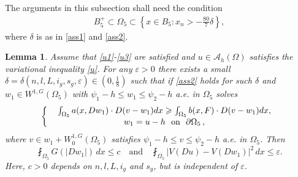 \documentclass[10pt,a4paper]{article}
\newtheorem{lemma}[theorem]{Lemma}
\theoremstyle{definition}
\numberwithin{equation}{section}
\begin{document}
 The arguments in this subsection shall need the condition
\begin{align}\label{ass3}
 B_5^+ \subset \Omega_5 \subset \left\{ x \in B_5 : x_n > -\frac{80}{7}\delta \right\},
\end{align}
where $\delta$ is as in \eqref{ass1} and \eqref{ass2}.
\begin{lemma}\label{uw1}
	 Assume that \eqref{u1}-\eqref{u3} are satisfied and   $u \in \mathcal{A}_{h}(\Omega)$   satisfies the variational inequality \eqref{u}.
	 For any $\varepsilon > 0$ there exists a small $\delta=\delta(n,l,L,i_g,s_g,\varepsilon) \in (0,\frac{1}{8})$ such that if \eqref{ass2} holds for such $\delta$ and  $w_1 \in W^{1,G}(\Omega_5)$ with $\psi_1-h\leqslant w_1\leqslant \psi_2-h $ a.e. in $\Omega_5$ solves
	 \begin{equation}\label{w1}
	 	\left\{\begin{array}{r@{\ \ }c@{\ \ }ll}
	 		&\int_{\Omega_5}  a(x,  Dw_1) \cdot D(v-w_1)dx \geqslant \int_{\Omega_5}  b(x, F) \cdot D(v-w_1)dx,  \\[0.05cm]
	 		&w_1=u-h \ \ \mbox{on}\ \ \partial \Omega_5 \,,
	 	\end{array}\right.
	 \end{equation}
	where $v\in w_1+W_0^{1,G}(\Omega_5)$ satisfies $\psi_1-h \leqslant v \leqslant \psi_2-h$ a.e. in $\Omega_5$.
	Then
	\begin{equation}\label{vuw1}
		\fint_{\Omega_5} G(|Dw_1|)\,dx \leq c \quad \text{and} \quad \fint_{\Omega_5} |V(Du)-V(Dw_1)|^2\,dx \leq \varepsilon.  
	\end{equation}
	Here, $c > 0$ depends on $n,l,L,i_g$ and $s_g$, but is independent of $\varepsilon$.
	
\end{lemma}
\end{document}
